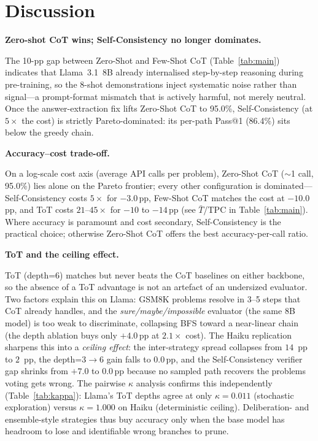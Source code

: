 \documentclass[conference]{IEEEtran}
\begin{document}
\section{Discussion}
\label{sec:discussion}

\vspace{4.5pt}\noindent\textbf{Zero-shot CoT wins; Self-Consistency no longer dominates.}

The 10-pp gap between Zero-Shot and Few-Shot CoT (Table~\ref{tab:main})
indicates that Llama~3.1~8B already internalised step-by-step reasoning
during pre-training, so the 8-shot demonstrations inject systematic
noise rather than signal---a prompt-format mismatch that is actively
harmful, not merely neutral.
Once the answer-extraction fix lifts Zero-Shot CoT to 95.0\%,
Self-Consistency (at $5\times$ the cost) is strictly Pareto-dominated:
its per-path Pass@1 (86.4\%) sits below the greedy chain.

\vspace{4.5pt}\noindent\textbf{Accuracy--cost trade-off.}

On a log-scale cost axis (average API calls per problem), Zero-Shot CoT
($\sim$1 call, 95.0\%) lies alone on the Pareto frontier; every other
configuration is dominated---Self-Consistency costs $5\times$ for
$-3.0$\,pp, Few-Shot CoT matches the cost at $-10.0$\,pp, and ToT costs
$21$--$45\times$ for $-10$ to $-14$\,pp (see $\bar{T}$/TPC in
Table~\ref{tab:main}).
Where accuracy is paramount and cost secondary, Self-Consistency is the
practical choice; otherwise Zero-Shot CoT offers the best
accuracy-per-call ratio.

\vspace{4.5pt}\noindent\textbf{ToT and the ceiling effect.}

ToT (depth=6) matches but never beats the CoT baselines on either
backbone, so the absence of a ToT advantage is not an artefact of an
undersized evaluator.
Two factors explain this on Llama: GSM8K problems resolve in 3--5 steps
that CoT already handles, and the \textit{sure/maybe/impossible}
evaluator (the same 8B model) is too weak to discriminate, collapsing
BFS toward a near-linear chain (the depth ablation buys only
$+4.0$\,pp at $2.1\times$ cost).
The Haiku replication sharpens this into a \emph{ceiling effect}: the
inter-strategy spread collapses from $14$~pp to $2$~pp, the
depth=3$\rightarrow$6 gain falls to $0.0$\,pp, and the
Self-Consistency verifier gap shrinks from $+7.0$ to $0.0$\,pp because
no sampled path recovers the problems voting gets wrong.
The pairwise $\kappa$ analysis confirms this independently
(Table~\ref{tab:kappa}): Llama's ToT depths agree at only
$\kappa=0.011$ (stochastic exploration) versus $\kappa=1.000$ on Haiku
(deterministic ceiling).
Deliberation- and ensemble-style strategies thus buy accuracy only when
the base model has headroom to lose and identifiable wrong branches to
prune.
\end{document}
